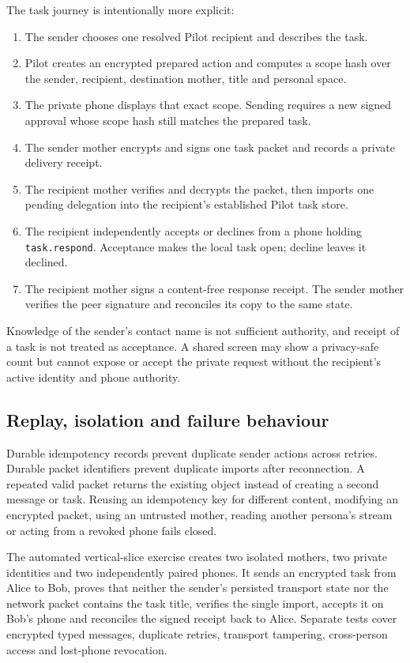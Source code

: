 The task journey is intentionally more explicit:
\begin{enumerate}
  \item The sender chooses one resolved Pilot recipient and describes the task.
  \item Pilot creates an encrypted prepared action and computes a scope hash over the sender,
  recipient, destination mother, title and personal space.
  \item The private phone displays that exact scope.  Sending requires a new signed approval whose
  scope hash still matches the prepared task.
  \item The sender mother encrypts and signs one task packet and records a private delivery receipt.
  \item The recipient mother verifies and decrypts the packet, then imports one pending delegation
  into the recipient's established Pilot task store.
  \item The recipient independently accepts or declines from a phone holding
  \texttt{task.respond}.  Acceptance makes the local task open; decline leaves it declined.
  \item The recipient mother signs a content-free response receipt.  The sender mother verifies
  the peer signature and reconciles its copy to the same state.
\end{enumerate}

Knowledge of the sender's contact name is not sufficient authority, and receipt of a task is not
treated as acceptance.  A shared screen may show a privacy-safe count but cannot expose or accept
the private request without the recipient's active identity and phone authority.

\subsection{Replay, isolation and failure behaviour}

Durable idempotency records prevent duplicate sender actions across retries.  Durable packet
identifiers prevent duplicate imports after reconnection.  A repeated valid packet returns the
existing object instead of creating a second message or task.  Reusing an idempotency key for
different content, modifying an encrypted packet, using an untrusted mother, reading another
persona's stream or acting from a revoked phone fails closed.

The automated vertical-slice exercise creates two isolated mothers, two private identities and two
independently paired phones.  It sends an encrypted task from Alice to Bob, proves that neither the
sender's persisted transport state nor the network packet contains the task title, verifies the
single import, accepts it on Bob's phone and reconciles the signed receipt back to Alice.  Separate
tests cover encrypted typed messages, duplicate retries, transport tampering, cross-person access
and lost-phone revocation.

